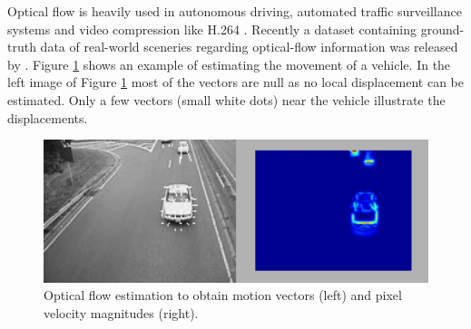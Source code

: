 \noindent Optical flow is heavily used in autonomous driving, automated traffic surveillance systems and video compression like H.264 \citep{cohen1999detecting, richardson2004h, kondermann2015stereo, menze2015object}.
Recently a dataset containing ground-truth data of real-world sceneries regarding optical-flow information was released by \citeauthor{kondermann2015stereo}.
Figure \ref{fig:optical-flow-estimation} shows an example of estimating the movement of a vehicle.
In the left image of Figure \ref{fig:optical-flow-estimation} most of the vectors are null as no local displacement can be estimated.
Only a few vectors (small white dots) near the vehicle illustrate the displacements.

\begin{figure}[h!]
  \centering
  \includegraphics[width=1.0\textwidth]{src/images/optical-flow-estimation.jpg}
  \caption[Optical flow estimation]{Optical flow estimation to obtain motion vectors (left) and pixel velocity magnitudes (right).\protect\footnotemark}
  \label{fig:optical-flow-estimation}
\end{figure}
